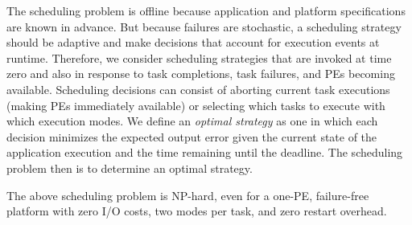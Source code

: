 The scheduling problem is offline because application and platform specifications 
are known in advance.  But because
failures are stochastic, a scheduling strategy should be
adaptive and make decisions that account for execution events at runtime.
Therefore, we consider scheduling strategies that are invoked at time zero
and also in response to task completions, task failures, and PEs becoming
available.  Scheduling decisions can consist of aborting current task executions
(making PEs immediately available) or selecting which tasks to execute with
which execution modes.  We define an \emph{optimal strategy} as one in
which each decision minimizes the expected output error given the current
state of the application execution and the time remaining until the
deadline. The scheduling problem then is to determine an optimal
strategy.



\begin{proposition}
\label{prop:np}
The above scheduling problem is NP-hard, even for a one-PE, failure-free platform
with zero I/O costs, two modes per task, and
zero restart overhead.
\end{proposition}


